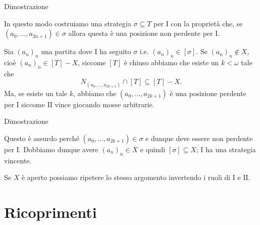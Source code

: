 \documentclass[aspectratio=43]{beamer}
\begin{document}
\begin{frame}{Dimostrazione}
  \begin{block}{}
    In questo modo costruiamo una strategia \(\sigma \subseteq T\) per \(\mathrm{I}\) con la proprietà che, se \((a_0, \ldots, a_{2n+1}) \in \sigma\) allora questa è una posizione non perdente per \(\mathrm{I}\).
  \end{block}
  \pause
  \begin{block}{}
    Sia \((a_n)_n\) una partita dove \(\mathrm{I}\) ha seguito \(\sigma\) i.e. \((a_n)_n \in [\sigma]\).
    Se \((a_n)_n \not\in X\), cioè \((a_n)_n \in [T] - X\), siccome \([T]\) è chiuso abbiamo che esiste un \(k < \omega\) tale che
    \begin{equation*}
      N_{(a_0, \ldots, a_{2k+1})}\cap[T] \subseteq [T] - X.
    \end{equation*}
    Ma, se esiste un tale \(k\), abbiamo che \((a_0, \ldots, a_{2k+1})\) è una posizione perdente per \(\mathrm{I}\) siccome \(\mathrm{II}\) vince giocando mosse arbitrarie.

  \end{block}
\end{frame}

\begin{frame}{Dimostrazione}
  \begin{block}{}
    Questo è assurdo perché \((a_0, \ldots, a_{2k+1}) \in \sigma\) e dunque deve essere non perdente per \(\mathrm{I}\).
    Dobbiamo dunque avere \((a_n)_n \in X\) e quindi \([\sigma] \subseteq X\); \(\mathrm{I}\) ha una strategia vincente.
  \end{block}
  \pause
  \begin{block}{}
    Se \(X\) è aperto possiamo ripetere lo stesso argomento invertendo i ruoli di \(\mathrm{I}\) e \(\mathrm{II}\).
    \begin{flushright}
      \qedsymbol
    \end{flushright}
  \end{block}
\end{frame}

\section{Ricoprimenti}
\end{document}
